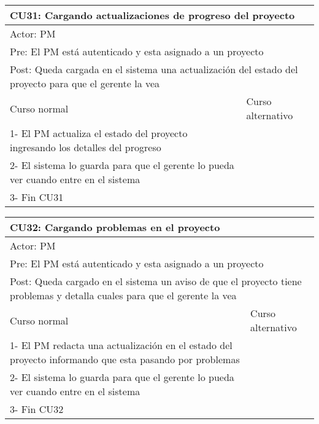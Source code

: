 \begin{table}[H]
  \begin{adjustbox}{max width = \textwidth}
  \begin{tabular}{|l|l|}
    \hline
    \multicolumn{2}{|l|}{CU31: Cargando actualizaciones de progreso del proyecto
} \\\hline
    \multicolumn{2}{|l|}{Actor: PM} \\\hline
    \multicolumn{2}{|l|}{Pre: El PM está autenticado y esta asignado a un proyecto} \\\hline
    \multicolumn{2}{|l|}{Post: Queda cargada en el sistema una actualización del estado del proyecto para que el gerente la vea} \\\hline
     Curso normal & Curso alternativo\\ \hline
	 1- El PM actualiza el estado del proyecto ingresando los detalles del progreso & \\ \hline
   2- El sistema lo guarda para que el gerente lo pueda ver cuando entre en el sistema & \\ \hline
   3- Fin CU31 & \\ \hline
  \end{tabular}
  \end{adjustbox}
\end{table}

\begin{table}[H]
  \begin{adjustbox}{max width = \textwidth}
  \begin{tabular}{|l|l|}
    \hline
    \multicolumn{2}{|l|}{CU32: Cargando problemas en el proyecto
} \\\hline
    \multicolumn{2}{|l|}{Actor: PM} \\\hline
    \multicolumn{2}{|l|}{Pre: El PM está autenticado y esta asignado a un proyecto} \\\hline
    \multicolumn{2}{|l|}{Post: Queda cargado en el sistema un aviso de que el proyecto tiene problemas y detalla cuales para que el gerente la vea} \\\hline
     Curso normal & Curso alternativo\\ \hline
	 1- El PM redacta una actualización en el estado del proyecto informando que esta pasando por problemas & \\ \hline
   2- El sistema lo guarda para que el gerente lo pueda ver cuando entre en el sistema & \\ \hline
   3- Fin CU32 & \\ \hline
  \end{tabular}
  \end{adjustbox}
\end{table}

